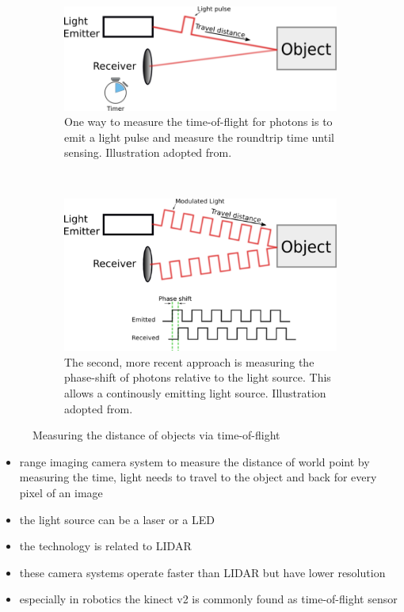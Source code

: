 \begin{figure}[H]
    \centering
    \begin{subfigure}[t]{0.45\textwidth}
        \includegraphics[width=\textwidth]{chapter03/img/tof_traveltime_original.png}
        \caption{One way to measure the time-of-flight for photons is to emit a light pulse and measure the roundtrip time until sensing. Illustration adopted from\cite{tof_cameras}.}
    \end{subfigure}~
    \begin{subfigure}[t]{0.45\textwidth}
        \includegraphics[width=\textwidth]{chapter03/img/tof_phase_shift_original.png}
        \caption{The second, more recent approach is measuring the phase-shift of photons relative to the light source. This allows a continously emitting light source. Illustration adopted from\cite{tof_cameras}.}
    \end{subfigure}
    \caption[Illustration of two commonly used measuring principle for Time-of-Flight cameras]{Measuring the distance of objects via time-of-flight\label{fig:tof_illustration}}
\end{figure}

\begin{itemize}
    \item range imaging camera system to measure the distance of world point by measuring the time, light needs to travel to the object and back for every pixel of an image
    \item the light source can be a laser or a LED
    \item the technology is related to LIDAR
    \item these camera systems operate faster than LIDAR but have lower resolution
    \item especially in robotics the kinect v2 is commonly found as time-of-flight sensor
\end{itemize}

